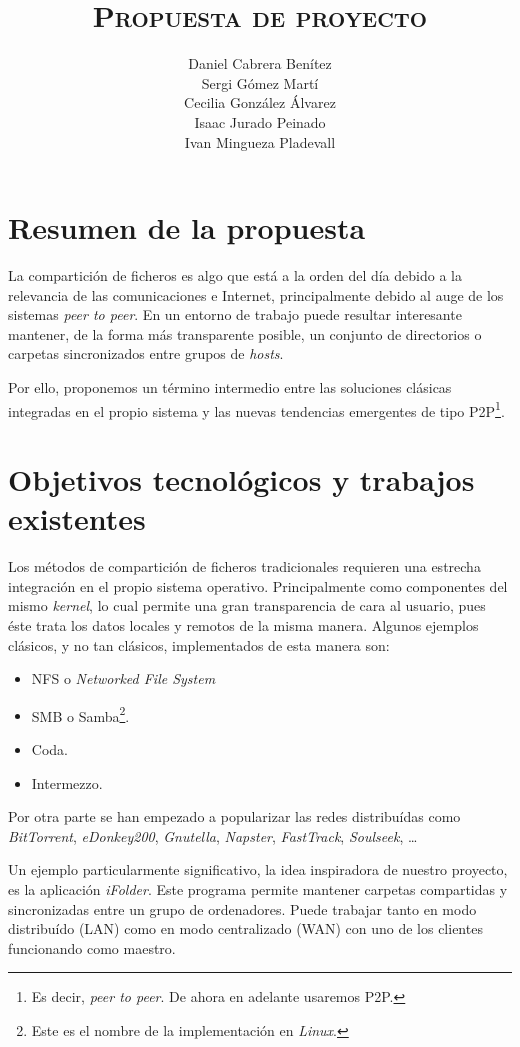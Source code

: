 \documentclass[a4paper,12pt,titlepage]{article}
\title{\textsc{\textbf{Propuesta de proyecto}}}
\author{Daniel Cabrera Benítez \\
Sergi Gómez Martí \\
Cecilia González Álvarez \\
Isaac Jurado Peinado \\
Ivan Mingueza Pladevall}
\begin{document}
\maketitle
\tableofcontents
\listoffigures
\listoftables
\newpage

\section{Resumen de la propuesta}

La compartición de ficheros es algo que está a la orden del día debido a la
relevancia de las comunicaciones e Internet, principalmente debido al auge de
los sistemas \emph{peer to peer}. En un entorno de trabajo puede resultar
interesante mantener, de la forma más transparente posible, un conjunto de
directorios o carpetas sincronizados entre grupos de \emph{hosts}.

Por ello, proponemos un término intermedio entre las soluciones clásicas
integradas en el propio sistema y las nuevas tendencias emergentes de tipo
P2P\footnote{Es decir, \emph{peer to peer}. De ahora en adelante usaremos
P2P.}.


\section{Objetivos tecnológicos y trabajos existentes}

Los métodos de compartición de ficheros tradicionales requieren una estrecha
integración en el propio sistema operativo. Principalmente como componentes
del mismo \emph{kernel}, lo cual permite una gran transparencia de cara al
usuario, pues éste trata los datos locales y remotos de la misma manera.
Algunos ejemplos clásicos, y no tan clásicos, implementados de esta manera
son:

\begin{itemize}
\item NFS o \emph{Networked File System}
\item SMB o Samba\footnote{Este es el nombre de la implementación en
\emph{Linux}.}.
\item Coda.
\item Intermezzo.
\end{itemize}

Por otra parte se han empezado a popularizar las redes distribuídas como
\emph{BitTorrent}, \emph{eDonkey200}, \emph{Gnutella}, \emph{Napster},
\emph{FastTrack}, \emph{Soulseek}, \ldots

Un ejemplo particularmente significativo, la idea inspiradora de nuestro
proyecto, es la aplicación \emph{iFolder}. Este programa permite mantener
carpetas compartidas y sincronizadas entre un grupo de ordenadores. Puede
trabajar tanto en modo distribuído (LAN) como en modo centralizado (WAN) con
uno de los clientes funcionando como maestro.
\end{document}
